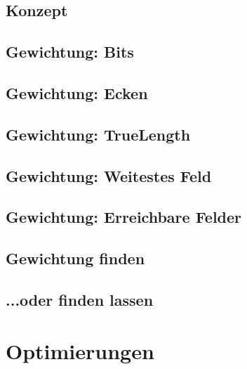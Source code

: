 \documentclass[12pt]{beamer}
\begin{document}
\subsection{Konzept} \begin{frame}\end{frame}
\subsection{Gewichtung: Bits} \begin{frame}\end{frame}
\subsection{Gewichtung: Ecken} \begin{frame}\end{frame}
\subsection{Gewichtung: TrueLength} \begin{frame}\end{frame}
\subsection{Gewichtung: Weitestes Feld} \begin{frame}\end{frame}
\subsection{Gewichtung: Erreichbare Felder} \begin{frame}\end{frame}
\subsection{Gewichtung finden} \begin{frame}\end{frame}
\subsection{...oder finden lassen} \begin{frame}\end{frame}

\section{Optimierungen}
\end{document}
